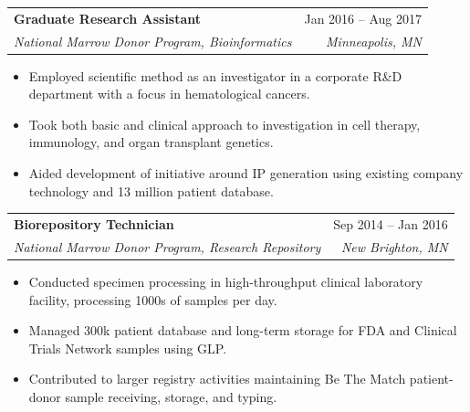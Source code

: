 \documentclass[letterpaper,11pt]{article}
\makeatletter
\newcommand{\resumeItem}[1]{
  \item\small{
    {#1 \vspace{-2pt}}
  }
}
\newcommand{\resumeSubheading}[4]{
  \vspace{-2pt}\item
    \begin{tabular*}{0.97\textwidth}[t]{l@{\extracolsep{\fill}}r}
      \textbf{#1} & #2 \\
      \textit{\small#3} & \textit{\small #4} \\
    \end{tabular*}\vspace{-7pt}
}
\newcommand{\resumeItemListStart}{\begin{itemize}}
\newcommand{\resumeItemListEnd}{\end{itemize}\vspace{-5pt}}
\makeatother
\begin{document}
%    
%    
    
    \resumeSubheading
      {Graduate Research Assistant}{Jan 2016 -- Aug 2017}
      {National Marrow Donor Program, Bioinformatics}{Minneapolis, MN}
      \resumeItemListStart
        \resumeItem{Employed scientific method as an investigator in a corporate R\&D department with a focus in hematological cancers.}
        \resumeItem{Took both basic and clinical approach to investigation in cell therapy, immunology, and organ transplant genetics.}
        \resumeItem{Aided development of initiative around IP generation using existing company technology and 13 million patient database.}
      \resumeItemListEnd

    \resumeSubheading
      {Biorepository Technician}{Sep 2014 -- Jan 2016}
      {National Marrow Donor Program, Research Repository}{New Brighton, MN}
      \resumeItemListStart
        \resumeItem{Conducted specimen processing in high-throughput clinical laboratory facility, processing 1000s of samples per day.}
        \resumeItem{Managed 300k patient database and long-term storage for FDA and Clinical Trials Network samples using GLP.}
        \resumeItem{Contributed to larger registry activities maintaining Be The Match patient-donor sample receiving, storage, and typing.}
      \resumeItemListEnd
\end{document}
